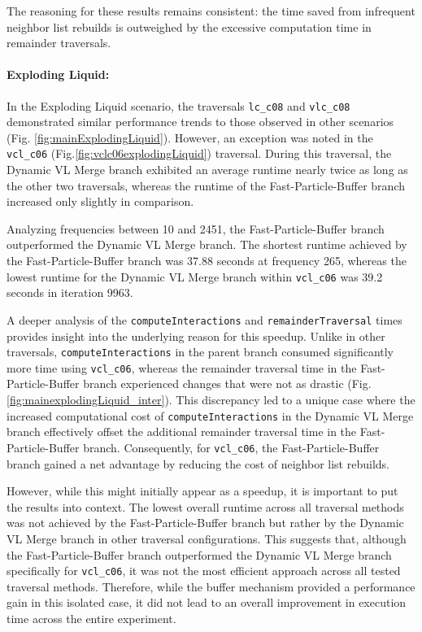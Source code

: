 The reasoning for these results remains consistent: the time saved from infrequent neighbor list rebuilds is outweighed by the excessive computation time in remainder traversals.

\paragraph{Exploding Liquid:}
In the Exploding Liquid scenario, the traversals \texttt{lc\_c08} and \texttt{vlc\_c08} demonstrated similar performance trends to those observed in other scenarios (Fig. \ref{fig:mainExplodingLiquid}). However, an exception was noted in the \texttt{vcl\_c06} (Fig.\ref{fig:vclc06explodingLiquid}) traversal. During this traversal, the Dynamic VL Merge branch exhibited an average runtime nearly twice as long as the other two traversals, whereas the runtime of the Fast-Particle-Buffer branch increased only slightly in comparison.

Analyzing frequencies between 10 and 2451, the Fast-Particle-Buffer branch outperformed the Dynamic VL Merge branch. The shortest runtime achieved by the Fast-Particle-Buffer branch was 37.88 seconds at frequency 265, whereas the lowest runtime for the Dynamic VL Merge branch within \texttt{vcl\_c06} was 39.2 seconds in iteration 9963. 


A deeper analysis of the \texttt{computeInteractions} and \texttt{remainderTraversal} times provides insight into the underlying reason for this speedup. Unlike in other traversals, \texttt{computeInteractions} in the parent branch consumed significantly more time using \texttt{vcl\_c06}, whereas the remainder traversal time in the Fast-Particle-Buffer branch experienced changes that were not as drastic (Fig. \ref{fig:mainexplodingLiquid_inter}). This discrepancy led to a unique case where the increased computational cost of \texttt{computeInteractions} in the Dynamic VL Merge branch effectively offset the additional remainder traversal time in the Fast-Particle-Buffer branch. Consequently, for \texttt{vcl\_c06}, the Fast-Particle-Buffer branch gained a net advantage by reducing the cost of neighbor list rebuilds.

However, while this might initially appear as a speedup, it is important to put the results into context. The lowest overall runtime across all traversal methods was not achieved by the Fast-Particle-Buffer branch but rather by the Dynamic VL Merge branch in other traversal configurations. This suggests that, although the Fast-Particle-Buffer branch outperformed the Dynamic VL Merge branch specifically for \texttt{vcl\_c06}, it was not the most efficient approach across all tested traversal methods. Therefore, while the buffer mechanism provided a performance gain in this isolated case, it did not lead to an overall improvement in execution time across the entire experiment.





